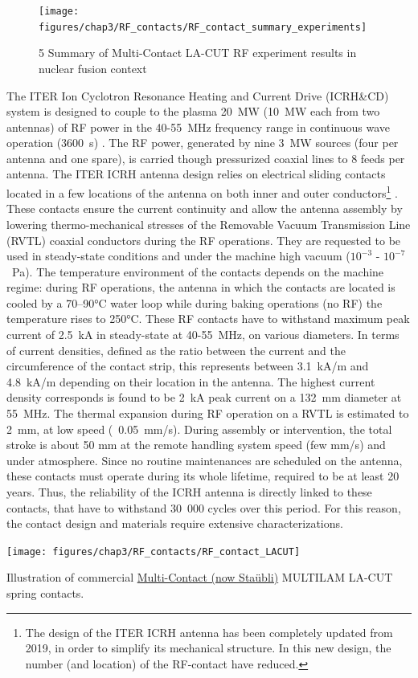 {\begin{figure}[h]
	\centering
	\texttt{[image: figures/chap3/RF\_contacts/RF\_contact\_summary\_experiments]}
	\caption{5 Summary of Multi-Contact LA-CUT RF experiment results in nuclear fusion context}
	\label{fig:rfcontactsummaryexperiments}
\end{figure}

The ITER Ion Cyclotron Resonance Heating and Current Drive (ICRH\&CD) system is designed to couple to the plasma 20~MW (10~MW each from two antennas) of RF power in the 40-55~MHz frequency range in continuous wave operation (3600~s) . The RF power, generated by nine 3~MW sources (four per antenna and one spare), is carried though pressurized coaxial lines to 8 feeds per antenna. The ITER ICRH antenna design relies on electrical sliding contacts located in a few locations of the antenna on both inner and outer conductors\footnote{The design of the ITER ICRH antenna has been completely updated from 2019, in order to simplify its mechanical structure. In this new design, the number (and location) of the RF-contact have reduced.} . These contacts ensure the current continuity and allow the antenna assembly by lowering thermo-mechanical stresses of the Removable Vacuum Transmission Line (RVTL) coaxial conductors during the RF operations. They are requested to be used in steady-state conditions and under the machine high vacuum ($ 10^{-3}$ - $10^{-7}$~\si{Pa}). The temperature environment of the contacts depends on the machine regime: during RF operations, the antenna in which the contacts are located is cooled by a 70–90$\si{\degreeCelsius}$ water loop while during baking operations (no RF) the temperature rises to 250$\si{\degreeCelsius}$. These RF contacts have to withstand maximum peak current of 2.5~kA in steady-state at 40-55~MHz, on various diameters. In terms of current densities, defined as the ratio between the current and the circumference of the contact strip, this represents between 3.1~kA/m and 4.8~kA/m depending on their location in the antenna. The highest current density corresponds is found to be 2~kA peak current on a 132~mm diameter at 55~MHz. The thermal expansion during RF operation on a RVTL is estimated to 2~mm, at low speed (~0.05~mm/s). During assembly or intervention, the total stroke is about 50 mm at the remote handling system speed (few \si{mm/s}) and under atmosphere. Since no routine maintenances are scheduled on the antenna, these contacts must operate during its whole lifetime, required to be at least 20 years. Thus, the reliability of the ICRH antenna is directly linked to these contacts, that have to withstand 30~000 cycles over this period. For this reason, the contact design and materials require extensive characterizations.
\begin{marginfigure}
	\centering
	\texttt{[image: figures/chap3/RF\_contacts/RF\_contact\_LACUT]}
	\caption{Illustration of commercial \href{https://ec.staubli.com/products/productline/7}{Multi-Contact (now Staübli)} MULTILAM  LA-CUT spring contacts. }
	\label{fig:rfcontactlacut}
\end{marginfigure}

}

